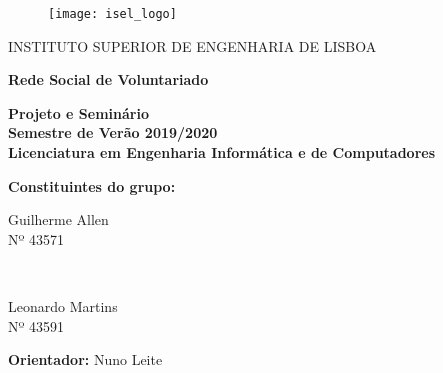 {\centering
	
	\begin{figure}[t!]
		\texttt{[image: isel\_logo]}	
		\centering
	\end{figure}
	
	
	\centerline{\LARGE{INSTITUTO SUPERIOR DE ENGENHARIA DE LISBOA}}
	\bigskip
	\bigskip
	
	{ \huge \bfseries Rede Social de Voluntariado}
	\bigskip\bigskip
	
	\textbf{
		Projeto e Seminário\\
		Semestre de Verão 2019/2020\\
		Licenciatura em Engenharia Informática e de Computadores
	}
	\bigskip
	\bigskip
	
	\large \textbf{Constituintes do grupo:}
	\bigskip
	
	\begin{minipage}{0.4\textwidth}
		\begin{flushleft} 
			Guilherme Allen\\
			Nº 43571\\
		\end{flushleft}
	\end{minipage}
	~	
	\begin{minipage}{0.4\textwidth}
		\begin{flushright} 
			Leonardo Martins\\ 
			Nº 43591\\
		\end{flushright}
	\end{minipage}
	\bigskip
	\bigskip
	
	\large \textbf{Orientador:} Nuno Leite
	
}